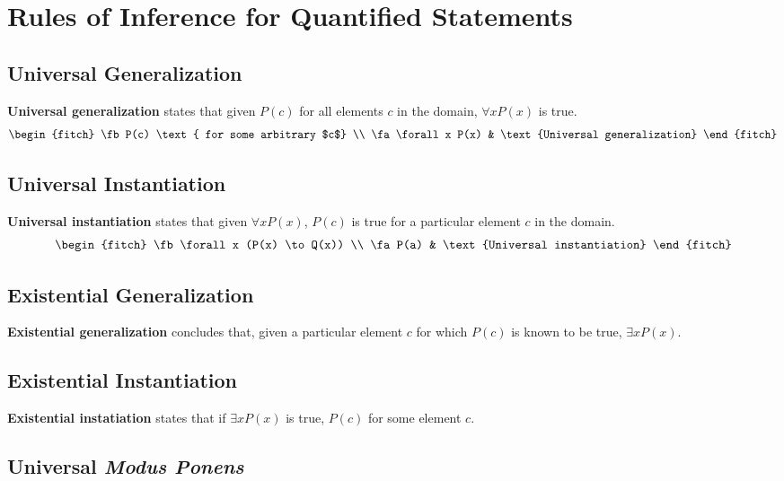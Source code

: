 \section{Rules of Inference for Quantified Statements}

\subsection{Universal Generalization}
  \textbf{Universal generalization} states that given $P(c)$ for all elements $c$
  in the domain, $\forall x P(x)$ is true.
 \begin{equation}
  \begin{fitch}
    \fb P(c) \text{ for some arbitrary $c$} \\
    \fa \forall x P(x) & \text{Universal generalization}
  \end{fitch}
  \label{eq:univ_gen}
\end{equation}


\subsection{Universal Instantiation}\label{univ_inst}
\textbf{Universal instantiation}  states that given $\forall x P(x)$, $P(c)$ is
true for a particular element $c$ in the domain.
\begin{equation}
  \begin{fitch}
    \fb \forall x (P(x) \to Q(x)) \\
    \fa P(a) & \text{Universal instantiation}
  \end{fitch}
  \label{eq:univ_inst}
\end{equation}

\subsection{Existential Generalization}
  \textbf{Existential generalization} concludes
  that, given a particular element $c$ for which $P(c)$ is known to be true, $\exists x P(x)$.


\subsection{Existential Instantiation}
  \textbf{Existential instatiation} states that if
  $\exists x P(x)$ is true, $P(c)$ for some element $c$.

\subsection{Universal \emph{Modus Ponens}}

